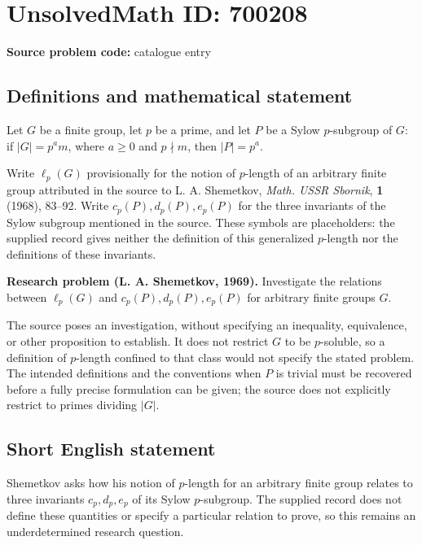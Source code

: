 \documentclass[11pt]{article}
\begin{document}
\section*{UnsolvedMath ID: 700208}
\textbf{Source problem code:} catalogue entry
\subsection{Definitions and mathematical statement}
Let \(G\) be a finite group, let \(p\) be a prime, and let \(P\) be a Sylow \(p\)-subgroup of \(G\): if \(|G|=p^a m\), where \(a\geq 0\) and \(p\nmid m\), then \(|P|=p^a\).

Write \(\ell_p(G)\) provisionally for the notion of \(p\)-length of an arbitrary finite group attributed in the source to L. A. Shemetkov, \emph{Math. USSR Sbornik}, \textbf{1} (1968), 83--92. Write \(c_p(P),d_p(P),e_p(P)\) for the three invariants of the Sylow subgroup mentioned in the source. These symbols are placeholders: the supplied record gives neither the definition of this generalized \(p\)-length nor the definitions of these invariants.

\textbf{Research problem (L. A. Shemetkov, 1969).} Investigate the relations between \(\ell_p(G)\) and \(c_p(P),d_p(P),e_p(P)\) for arbitrary finite groups \(G\).

The source poses an investigation, without specifying an inequality, equivalence, or other proposition to establish. It does not restrict \(G\) to be \(p\)-soluble, so a definition of \(p\)-length confined to that class would not specify the stated problem. The intended definitions and the conventions when \(P\) is trivial must be recovered before a fully precise formulation can be given; the source does not explicitly restrict to primes dividing \(|G|\).
\subsection{Short English statement}
Shemetkov asks how his notion of \(p\)-length for an arbitrary finite group relates to three invariants \(c_p,d_p,e_p\) of its Sylow \(p\)-subgroup. The supplied record does not define these quantities or specify a particular relation to prove, so this remains an underdetermined research question.
\end{document}
